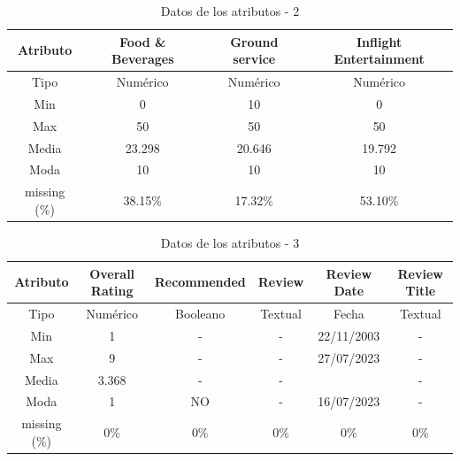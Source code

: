 \documentclass[es]{uc3mreport}
\begin{document}
\begin{report}
\begin{table}[H]
    \center
    \begin{tabular}{@{}cccc@{}}
        \toprule
        Atributo     & Food \& Beverages & Ground service & Inflight Entertainment \\ 
        \midrule
        Tipo         & Numérico          & Numérico       & Numérico               \\ 
        Min          & 0                 & 10             & 0                      \\ 
        Max          & 50                & 50             & 50                     \\ 
        Media        & 23.298            & 20.646         & 19.792                 \\ 
        Moda         & 10                & 10             & 10                     \\ 
        missing (\%) & 38.15\%           & 17.32\%        & 53.10\%                \\ 
        \bottomrule
    \end{tabular} 
    \caption{Datos de los atributos - 2}
\end{table}
\begin{table}[H]
    \center
    \begin{tabular}{@{}cccccc@{}}
        \toprule
        Atributo     & Overall Rating  & Recommended & Review  & Review Date & Review Title \\ 
        \midrule                      
        Tipo         & Numérico        & Booleano    & Textual & Fecha       & Textual      \\ 
        Min          & 1               & -           & -       & 22/11/2003  & -            \\ 
        Max          & 9               & -           & -       & 27/07/2023  & -            \\ 
        Media        & 3.368           & -           & -       &             & -            \\ 
        Moda         & 1               & NO          & -       & 16/07/2023  & -            \\ 
        missing (\%) & 0\%             & 0\%         & 0\%     & 0\%         & 0\%          \\ 
        \bottomrule
    \end{tabular} 
    \caption{Datos de los atributos - 3}
\end{table}
\begin{table}[H]

\end{table}
\end{report}
\end{document}
